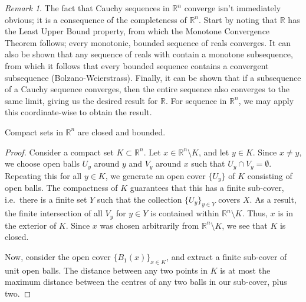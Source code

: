 \documentclass[11pt]{article}
\newcommand{\R}{\mathbb{R}}
\theoremstyle{definition}
\theoremstyle{remark}
\newtheorem*{remark}{Remark}
\numberwithin{equation}{section}
\begin{document}
    \begin{remark}
        The fact that Cauchy sequences in $\R^n$ converge isn't immediately obvious;
        it is a consequence of the completeness of $\R^n$. Start by noting that $\R$
        has the Least Upper Bound property, from which the Monotone Convergence
        Theorem follows; every monotonic, bounded sequence of reals converges. It
        can also be shown that any sequence of reals with contain a monotone
        subsequence, from which it follows that every bounded sequence contains a
        convergent subsequence (Bolzano-Weierstrass). Finally, it can be shown that
        if a subsequence of a Cauchy sequence converges, then the entire sequence
        also converges to the same limit, giving us the desired result for $\R$. For
        sequence in $\R^n$, we may apply this coordinate-wise to obtain the result.
    \end{remark}

    \begin{lemma}
        Compact sets in $\R^n$ are closed and bounded.
    \end{lemma}
    \begin{proof}
        Consider a compact set $K \subset \R^n$. Let $x \in \R^n \setminus K$, and
        let $y \in K$. Since $x \neq y$, we choose open balls $U_y$ around $y$ and
        $V_y$ around $x$ such that $U_y\cap V_y = \emptyset$. Repeating this for all
        $y \in K$, we generate an open cover $\{U_y\}$ of $K$ consisting of open balls. The
        compactness of $K$ guarantees that this has a finite sub-cover, i.e.\ there
        is a finite set $Y$ such that the collection $\{U_y\}_{y \in Y}$ covers $X$.
        As a result, the finite intersection of all $V_y$ for $y \in Y$ is contained
        within $\R^n \setminus K$. Thus, $x$ is in the exterior of $K$. Since $x$ was
        chosen arbitrarily from $\R^n\setminus K$, we see that $K$ is closed.

        Now, consider the open cover $\{B_1(x)\}_{x \in K}$, and extract a finite
        sub-cover of unit open balls. The distance between any two points in $K$ is
        at most the maximum distance between the centres of any two balls in our
        sub-cover, plus two.
    \end{proof}
\end{document}
